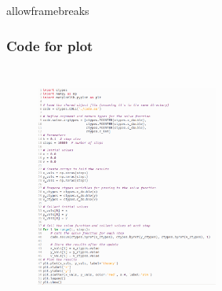 \documentclass{beamer}
\begin{document}
\begin{frame}{allowframebreaks}
\frametitle{Code for plot}
\begin{figure}[ht]
                        \centering
                        \includegraphics[width=6cm, height=8cm]{figs/fig3.png}

                        
\end{figure}
\end{frame}
\end{document}
